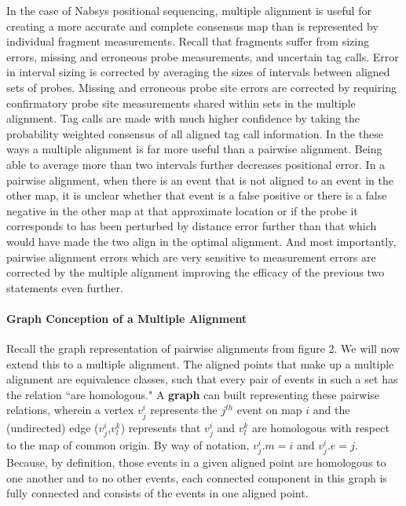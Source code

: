 \documentclass[11pt]{article}
\begin{document}
\par{
In the case of Nabsys positional sequencing, multiple alignment is useful for creating a more accurate and complete consensus map than is represented by individual fragment measurements. Recall that fragments suffer from sizing errors, missing and erroneous probe measurements, and uncertain tag calls.  Error in interval sizing is corrected by averaging the sizes of intervals between aligned sets of probes.  Missing and erroneous probe site errors are corrected by requiring confirmatory probe site measurements shared within sets in the multiple alignment. Tag calls are made with much higher confidence by taking the probability weighted consensus of all aligned tag call information.  In the these ways a multiple alignment is far more useful than a pairwise alignment.  Being able to average more than two intervals further decreases positional error.  In a pairwise alignment, when there is an event that is not aligned to an event in the other map, it is unclear whether that event is a false positive or there is a false negative in the other map at that approximate location or if the probe it corresponds to has been perturbed by distance error further than that which would have made the two align in the optimal alignment.  And most importantly, pairwise alignment errors which are very sensitive to measurement errors are corrected by the multiple alignment improving the efficacy of the previous two statements even further.
}
\paragraph{Graph Conception of a Multiple Alignment\newline}
\par{
Recall the graph representation of pairwise alignments from figure 2.  We will now extend this to a multiple alignment.  The aligned points that make up a multiple alignment are equivalence classes, such that every pair of events in such a set has the relation ``are homologous." A \textbf{graph} can built representing these pairwise relations, wherein a vertex $v^{i}_j$ represents the $j^{th}$ event on map $i$ and the (undirected) edge ($v^{i}_j$,$v^k_l$) represents that $v^i_j$ and $v^k_l$ are homologous with respect to the map of common origin.  By way of notation, $v^i_j.m = i$ and $v^i_j.e = j$.  Because, by definition, those events in a given aligned point are homologous to one another and to no other events, each connected component in this graph is fully connected and consists of the events in one aligned point.\cite{Corel}
}
\end{document}
